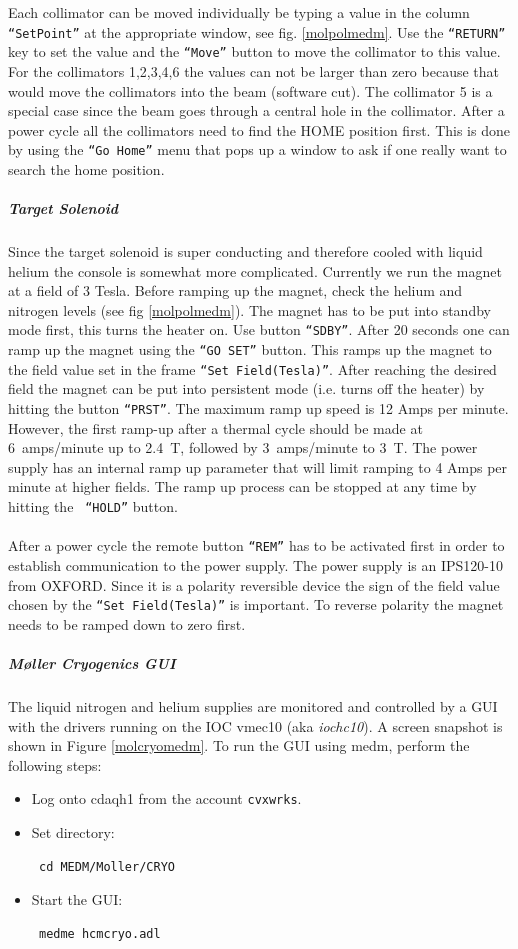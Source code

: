 Each collimator can be moved individually be typing a value in the 
column {\tt ``SetPoint''}
at the appropriate window, see fig. \ref{molpolmedm}. Use the {\tt ``RETURN''} key
to set the value and the {\tt ``Move''} button to move the collimator
to this value. For the collimators 1,2,3,4,6 the values can not 
be larger than zero because that would move the collimators into the
beam (software cut). The collimator 5 is a special case since the beam goes through
a central hole in the collimator. 
After a power cycle all the collimators need to find the HOME position
first.  This is done by using the {\tt ``Go Home''} menu that pops up
a window to ask if one really want to search the home position. 
%
\subparagraph{Target Solenoid}
Since the target solenoid is super conducting and therefore cooled
with liquid helium the console is somewhat more complicated.
Currently we run the magnet at a field of 3 Tesla. Before ramping
up the magnet, check the helium and nitrogen levels
(see fig \ref{molpolmedm}). The magnet has to be put 
into standby mode first, this turns the heater on.  Use button {\tt ``SDBY''}. 
After 20 seconds one
can ramp up the magnet using the {\tt ``GO SET''} button. This ramps up
the magnet to the field value set in the frame {\tt ``Set Field(Tesla)''}.
After reaching the desired field the magnet can be put into persistent mode 
(i.e. turns off the heater) by hitting the button {\tt ``PRST''}. 
The maximum ramp up speed is 12 Amps per minute. 
However, the first ramp-up after a thermal cycle should be made at
6~amps/minute up to 2.4~T, followed by 3~amps/minute to 3~T.
The power supply has an internal ramp up parameter
that will limit ramping to 4 Amps per minute at higher fields.
The ramp up process can be stopped at any time by hitting the {\tt
``HOLD''} button. \\ \\
After a power cycle the remote button {\tt ``REM''} has to be activated
first in order to establish communication to the power supply.
The power supply is an IPS120-10 from OXFORD. Since it is a polarity
reversible device the sign of the field value chosen by the
{\tt ``Set Field(Tesla)''} is important. To reverse polarity the magnet
needs to be ramped down to zero first.
%


\newpage
\subparagraph{M\o ller Cryogenics GUI}
The liquid nitrogen and helium supplies are monitored and controlled by
a GUI with the drivers running on the IOC vmec10 (aka {\it iochc10}).
A screen snapshot is shown in Figure \ref{molcryomedm}.
To run the GUI using medm, perform the following steps:
\begin{itemize}
\item Log onto cdaqh1 from the account {\tt cvxwrks}.
\item Set directory: \begin{verbatim} cd MEDM/Moller/CRYO \end{verbatim}
\item Start the GUI: \begin{verbatim} medme hcmcryo.adl  \end{verbatim} 
\end{itemize}

